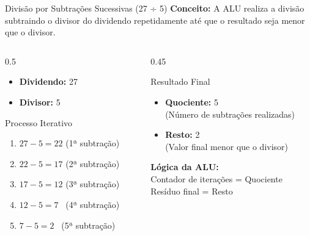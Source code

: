 \begin{frame}{Divisão por Subtrações Sucessivas (27 ÷ 5)}
    \textbf{Conceito:} A ALU realiza a divisão subtraindo o divisor do dividendo repetidamente até que o resultado seja menor que o divisor.

    \begin{columns}
        \begin{column}{0.5\textwidth}
            \begin{itemize}
                \item \textbf{Dividendo:} 27
                \item \textbf{Divisor:} 5
            \end{itemize}

            \begin{block}{Processo Iterativo}
                \begin{enumerate}
                    \item $27 - 5 = 22$ \quad (1ª subtração)
                    \item $22 - 5 = 17$ \quad (2ª subtração)
                    \item $17 - 5 = 12$ \quad (3ª subtração)
                    \item $12 - 5 = 7$ \quad \ (4ª subtração)
                    \item $7 - 5 = 2$ \quad \ (5ª subtração)
                \end{enumerate}
            \end{block}
        \end{column}

        \begin{column}{0.45\textwidth}
            \begin{exampleblock}{Resultado Final}
                \begin{itemize}
                    \item \textbf{Quociente:} 5 \\ (Número de subtrações realizadas)
                    \item \textbf{Resto:} 2 \\ (Valor final menor que o divisor)
                \end{itemize}
            \end{exampleblock}

            \vspace{0.5cm}
            \centering
            \textbf{Lógica da ALU:} \\
            Contador de iterações = Quociente \\
            Resíduo final = Resto
        \end{column}
    \end{columns}
\end{frame}

